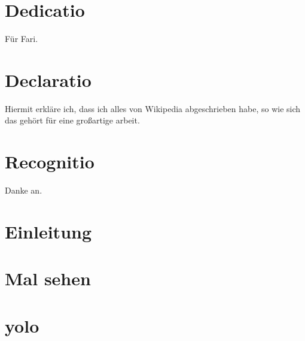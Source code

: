 \documentclass[12pt, twoside]{report} %
\begin{document}


\chapter*{Dedicatio}
Für Fari.

\chapter*{Declaratio}
Hiermit erkläre ich, dass ich alles von Wikipedia abgeschrieben habe, so
wie sich das gehört für eine großartige arbeit.

\chapter*{Recognitio}
Danke an.

\tableofcontents

\chapter{Einleitung}


\chapter{Mal sehen}


\appendix
\chapter{yolo}


\printbibliography
\end{document}
